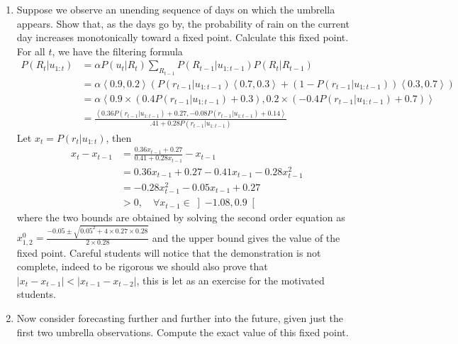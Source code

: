 \documentclass[9pt,a4paper]{extarticle}
\newenvironment{solution}
    {%
    \color{red}
    }
    { 
    \color{black}
    }
\begin{document}
    \begin{enumerate}
        \item Suppose we observe an unending sequence of days on which the umbrella appears. Show that, as the days go by, the probability of rain on the current day increases monotonically toward a fixed point. Calculate this fixed point.
        \begin{solution}\\
        For all $t$, we have the filtering formula
        \begin{align}
            P(R_t|u_{1:t}) &= \alpha P(u_t|R_t) \sum_{R_{t-1}} P(R_{t-1}|u_{1:t-1}) P(R_t|R_{t-1})\\
            &= \alpha \left<0.9, 0.2\right> (P(r_{t-1}|u_{1:t-1})\left<0.7, 0.3\right> + (1 - P(r_{t-1}|u_{1:t-1}))\left<0.3, 0.7\right>)\\
            &=\alpha \left<0.9\times (0.4P(r_{t-1}|u_{1:t-1}) + 0.3), 0.2\times(-0.4P(r_{t-1}|u_{1:t-1}) + 0.7)\right>\\
            &= \frac{\left<0.36 P(r_{t-1}|u_{1:t-1}) + 0.27, -0.08P(r_{t-1}|u_{1:t-1}) + 0.14\right>}{.41 + 0.28P(r_{t-1}|u_{1:t-1}) }
        \end{align}
        Let $x_t = P(r_t|u_{1:t})$, then
        \begin{align}
            x_t - x_{t-1} &= \frac{0.36x_{t-1} + 0.27}{0.41 + 0.28x_{t-1}} - x_{t-1}\\
            &= 0.36x_{t-1} + 0.27 - 0.41 x_{t-1} - 0.28x_{t-1}^2\\
            &= - 0.28x_{t-1}^2 - 0.05x_{t-1} + 0.27\\
            &> 0, \quad \forall x_{t-1} \in \left]-1.08, 0.9\right[
        \end{align}
        where the two bounds are obtained by solving the second order equation as $x_{1,2}^0 = \frac{-0.05 \pm \sqrt{0.05^2 + 4 \times 0.27 \times 0.28}}{2 \times 0.28}$ and the upper bound gives the value of the fixed point.
        Careful students will notice that the demonstration is not complete, indeed to be rigorous we should also prove that $\left|x_t - x_{t-1}\right| < \left|x_{t-1} - x_{t-2}\right|$, this is let as an exercise for the motivated students.
        \end{solution}
        \item Now consider forecasting further and further into the future, given just the first two umbrella observations. Compute the exact value of this fixed point.
        \begin{solution}

\end{solution}
\end{enumerate}
\end{document}
